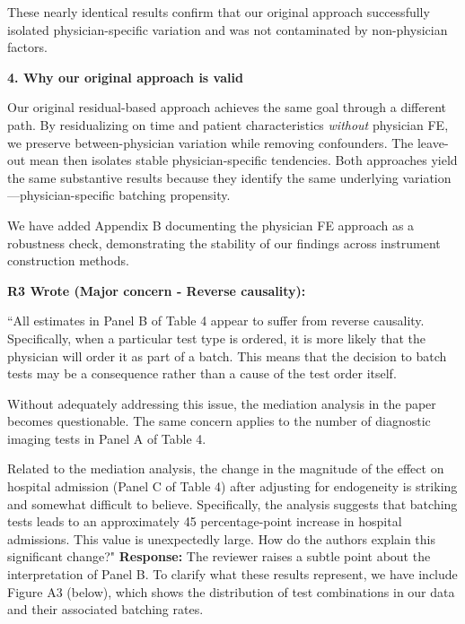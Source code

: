 \documentclass[11pt]{article}
\newenvironment{quote2}
{ \bigskip
\noindent
         \small\em
         \baselineskip=14pt
}
\newcommand{\1}{\hbox{\rm 1\kern-.35em 1}}
\begin{document}
{These nearly identical results confirm that our original approach successfully isolated physician-specific variation and was not contaminated by non-physician factors.

\bigskip
\noindent\textbf{4. Why our original approach is valid}

Our original residual-based approach achieves the same goal through a different path. By residualizing on time and patient characteristics \textit{without} physician FE, we preserve between-physician variation while removing confounders. The leave-out mean then isolates stable physician-specific tendencies. Both approaches yield the same substantive results because they identify the same underlying variation—physician-specific batching propensity.

We have added Appendix B documenting the physician FE approach as a robustness check, demonstrating the stability of our findings across instrument construction methods.
\color{black}

\color{black}

\begin{quote2}
\textbf{R3 Wrote (Major concern -  Reverse causality):}  

\noindent ``All estimates in Panel B of Table 4 appear to suffer from reverse causality. Specifically, when a particular test type is ordered, it is more likely that the physician will order it as part of a batch. This means that the decision to batch tests may be a consequence rather than a cause of the test order itself.

Without adequately addressing this issue, the mediation analysis in the paper becomes questionable. The same concern applies to the number of diagnostic imaging tests in Panel A of Table 4.

Related to the mediation analysis, the change in the magnitude of the effect on hospital admission (Panel C of Table 4) after adjusting for endogeneity is striking and somewhat difficult to believe. Specifically, the analysis suggests that batching tests leads to an approximately 45 percentage-point increase in hospital admissions. This value is unexpectedly large. How do the authors explain this significant change?"
\end{quote2}

\noindent\textbf{Response:} \color{blue}
The reviewer raises a subtle point about the interpretation of Panel B. To clarify what these results represent, we have include Figure A3 (below), which shows the distribution of test combinations in our data and their associated batching rates.

}
\end{document}
